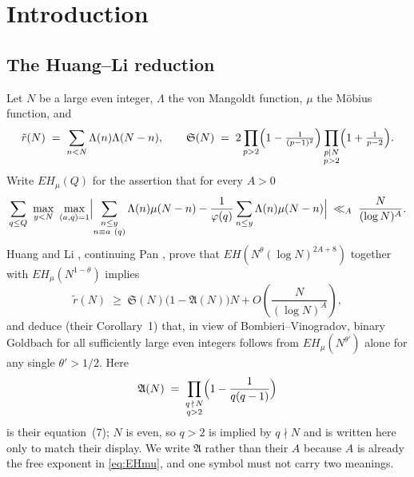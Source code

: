\documentclass[11pt,a4paper]{article}
\theoremstyle{plain}
\theoremstyle{definition}
\theoremstyle{remark}
\renewcommand{\SS}{\mathfrak{S}}
\newcommand{\AAA}{\mathfrak{A}}
\begin{document}
\begin{abstract}
We state plainly what is not claimed. Theorem~\ref{thm:A} removes only
the part of the demand that carries no Goldbach content, and the net
progress toward the Goldbach conjecture is zero. We also state plainly
what is standard: the ingredients of Theorem~\ref{thm:A} are classical
and its mechanism --- a divisor switch that moves the work onto a
short variable, followed by Bombieri--Vinogradov --- is ordinary
practice. What is offered is the application, the identity it makes
visible, and the corrections both turn out to require. The finite
rearrangements the argument runs on are formalised in Lean~4 against
Mathlib, over arbitrary functions, so that what is checked is that they
use no arithmetic property of $\Lambda$ or $\mu$.
\end{abstract}

\section{Introduction}

\subsection{The Huang--Li reduction}

Let $N$ be a large even integer, $\Lambda$ the von Mangoldt function,
$\mu$ the M\"obius function, and
\[
  \tilde r(N)\;=\;\sum_{n<N}\Lambda(n)\Lambda(N-n),
  \qquad
  \SS(N)\;=\;2\prod_{p>2}\Bigl(1-\tfrac{1}{(p-1)^2}\Bigr)
              \prod_{\substack{p\mid N\\ p>2}}\Bigl(1+\tfrac{1}{p-2}\Bigr).
\]
Write $EH_\mu(Q)$ for the assertion that for every $A>0$
\begin{equation}\label{eq:EHmu}
  \sum_{q\le Q}\ \max_{y<N}\ \max_{(a,q)=1}
  \Bigl|\sum_{\substack{n\le y\\ n\equiv a\ (q)}}\Lambda(n)\mu(N-n)
        -\frac{1}{\varphi(q)}\sum_{n\le y}\Lambda(n)\mu(N-n)\Bigr|
  \;\ll_A\;\frac{N}{(\log N)^A}.
\end{equation}
Huang and Li \cite{HL}, continuing Pan \cite{Pan}, prove that
$EH(N^{\theta}(\log N)^{2A+8})$ together with $EH_\mu(N^{1-\theta})$
implies
\begin{equation}\label{eq:HLthm1}
  \tilde r(N)\;\ge\;\SS(N)\bigl(1-\AAA(N)\bigr)N
    +O\!\left(\frac{N}{(\log N)^A}\right),
\end{equation}
and deduce (their Corollary~1) that, in view of Bombieri--Vinogradov,
binary Goldbach for all sufficiently large even integers follows from
$EH_\mu(N^{\theta'})$ alone for any single $\theta'>1/2$. Here
\begin{equation}\label{eq:AN}
  \AAA(N)\;=\;\prod_{\substack{q\,\nmid\,N\\ q>2}}
     \Bigl(1-\frac{1}{q(q-1)}\Bigr)
\end{equation}
is their equation~(7); $N$ is even, so $q>2$ is implied by $q\nmid N$
and is written here only to match their display. We write $\AAA$ rather than their $A$ because
$A$ is already the free exponent in \eqref{eq:EHmu}, and one symbol
must not carry two meanings.
\end{document}
